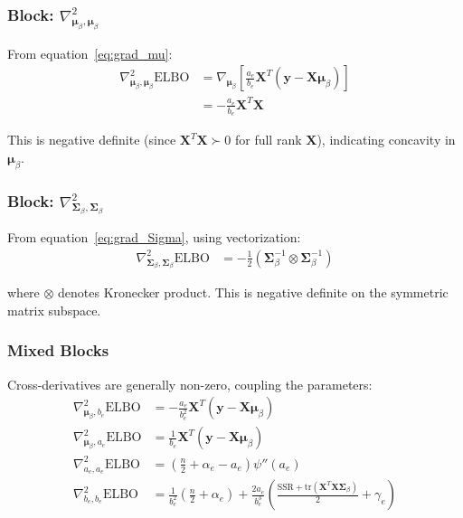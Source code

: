 \documentclass[11pt]{article}
\newcommand{\ELBO}{\text{ELBO}}
\newcommand{\tr}{\text{tr}}
\begin{document}
\subsubsection{Block: \texorpdfstring{$\nabla^2_{\bm{\mu}_\beta, \bm{\mu}_\beta}$}{Hessian mu-mu}}

From equation~\eqref{eq:grad_mu}:
\begin{align}
\nabla^2_{\bm{\mu}_\beta, \bm{\mu}_\beta} \ELBO &= \nabla_{\bm{\mu}_\beta}\left[\frac{a_e}{b_e} \bm{X}^T(\bm{y} - \bm{X}\bm{\mu}_\beta)\right] \nonumber\\
&= -\frac{a_e}{b_e} \bm{X}^T\bm{X}
\label{eq:hess_mumu}
\end{align}

This is negative definite (since $\bm{X}^T\bm{X} \succ 0$ for full rank $\bm{X}$), indicating concavity in $\bm{\mu}_\beta$.

\subsubsection{Block: \texorpdfstring{$\nabla^2_{\bm{\Sigma}_\beta, \bm{\Sigma}_\beta}$}{Hessian Sigma-Sigma}}

From equation~\eqref{eq:grad_Sigma}, using vectorization:
\begin{align}
\nabla^2_{\bm{\Sigma}_\beta, \bm{\Sigma}_\beta} \ELBO &= -\frac{1}{2}(\bm{\Sigma}_\beta^{-1} \otimes \bm{\Sigma}_\beta^{-1})
\end{align}

where $\otimes$ denotes Kronecker product. This is negative definite on the symmetric matrix subspace.

\subsubsection{Mixed Blocks}

Cross-derivatives are generally non-zero, coupling the parameters:
\begin{align}
\nabla^2_{\bm{\mu}_\beta, b_e} \ELBO &= -\frac{a_e}{b_e^2} \bm{X}^T(\bm{y} - \bm{X}\bm{\mu}_\beta)\\
\nabla^2_{\bm{\mu}_\beta, a_e} \ELBO &= \frac{1}{b_e} \bm{X}^T(\bm{y} - \bm{X}\bm{\mu}_\beta)\\
\nabla^2_{a_e, a_e} \ELBO &= \left(\frac{n}{2} + \alpha_e - a_e\right)\psi''(a_e)\\
\nabla^2_{b_e, b_e} \ELBO &= \frac{1}{b_e^2}\left(\frac{n}{2} + \alpha_e\right) + \frac{2a_e}{b_e^3}\left(\frac{\text{SSR} + \tr(\bm{X}^T\bm{X}\bm{\Sigma}_\beta)}{2} + \gamma_e\right)
\end{align}
\end{document}
